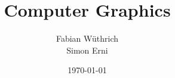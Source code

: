 \titlehead{Hochschule Luzern \\ 
	Technik \& Architektur}
\subject{Zusammenfassung}
\title{Computer Graphics}
\subtitle{}
\author{Fabian Wüthrich \\ 
	Simon Erni}
\date{\today}

\maketitle